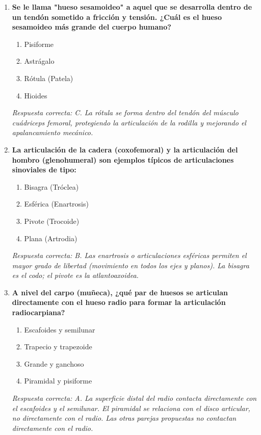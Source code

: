\begin{enumerate}[label=\textbf{\arabic*.}]
    \item \textbf{Se le llama "hueso sesamoideo" a aquel que se desarrolla dentro de un tendón sometido a fricción y tensión. ¿Cuál es el hueso sesamoideo más grande del cuerpo humano?}
    \begin{enumerate}
        \item[A)] Pisiforme
        \item[B)] Astrágalo
        \item[C)] Rótula (Patela)
        \item[D)] Hioides
    \end{enumerate}
    \textit{Respuesta correcta: C. La rótula se forma dentro del tendón del músculo cuádriceps femoral, protegiendo la articulación de la rodilla y mejorando el apalancamiento mecánico.}

    \item \textbf{La articulación de la cadera (coxofemoral) y la articulación del hombro (glenohumeral) son ejemplos típicos de articulaciones sinoviales de tipo:}
    \begin{enumerate}
        \item[A)] Bisagra (Tróclea)
        \item[B)] Esférica (Enartrosis)
        \item[C)] Pivote (Trocoide)
        \item[D)] Plana (Artrodia)
    \end{enumerate}
    \textit{Respuesta correcta: B. Las enartrosis o articulaciones esféricas permiten el mayor grado de libertad (movimiento en todos los ejes y planos). La bisagra es el codo; el pivote es la atlantoaxoidea.}

    \item \textbf{A nivel del carpo (muñeca), ¿qué par de huesos se articulan directamente con el hueso radio para formar la articulación radiocarpiana?}
    \begin{enumerate}
        \item[A)] Escafoides y semilunar
        \item[B)] Trapecio y trapezoide
        \item[C)] Grande y ganchoso
        \item[D)] Piramidal y pisiforme
    \end{enumerate}
    \textit{Respuesta correcta: A. La superficie distal del radio contacta directamente con el escafoides y el semilunar. El piramidal se relaciona con el disco articular, no directamente con el radio. Las otras parejas propuestas no contactan directamente con el radio.}


\end{enumerate}
